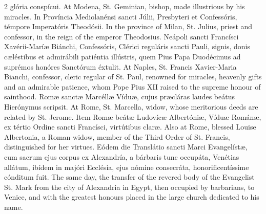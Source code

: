 \begin{paracol}{2}
 glória conspícui.
\switchcolumn
{}
At Modena, St. Geminian, bishop, made illustrious by his miracles.
\switchcolumn*
{}
In Província Mediolanénsi sancti Júlii, Presbyteri et Confessóris, témpore 
 Imperatóris Theodósii.
\switchcolumn
{}
In the province of Milan, St. Julius, priest and confessor, in the reign of 
 the emperor Theodosius.
\switchcolumn*
{}
Neápoli sancti Francísci Xavérii-Maríæ Biánchi, 
 Confessóris, Clérici reguláris sancti Pauli, signis, donis cæléstibus et 
 admirábili patiéntia illústris, quem Pius Papa Duodécimus ad suprémos 
 honóres Sanctórum éxtulit.
\switchcolumn
{}
At Naples, St. Francis Xavier-Maria Bianchi, confessor, cleric regular of 
 St. Paul, renowned for miracles, heavenly gifts and an admirable patience, 
 whom Pope Pius XII raised to the supreme honour of sainthood.
\switchcolumn*
{}
Romæ sanctæ Marcéllæ Víduæ, cujus præcláras 
 laudes beátus Hierónymus scripsit.
\switchcolumn
{}
At Rome, St. Marcella, widow, whose meritorious deeds are related by St. 
 Jerome.
\switchcolumn*
{}
Item Romæ beátæ Ludovícæ Albertóniæ, Víduæ 
 Románæ, ex tértio Ordine sancti Francísci, virtútibus claræ.
\switchcolumn
{}
Also at Rome, blessed Louise Albertonia, a Roman widow, member of the Third 
 Order of St. Francis, distinguished for her virtues.
\switchcolumn*
{}
Eódem die Translátio sancti Marci Evangelístæ, 
 cum sacrum ejus corpus ex Alexandría, a bárbaris tunc occupáta, Venétias 
 allátum, ibídem in majóri Ecclésia, ejus nómine consecráta, 
 honorificentíssime cónditum fuit.
\switchcolumn
{}
The same day, the transfer of the revered body of the Evangelist St. Mark 
 from the city of Alexandria in Egypt, then occupied by barbarians, to 
 Venice, and with the greatest honours placed in the large church dedicated 
 to his name.
\switchcolumn*
{}
\end{paracol}
